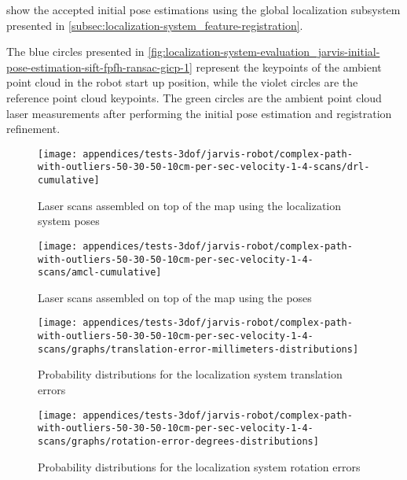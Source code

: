  show the accepted initial pose estimations using the global localization subsystem presented in \cref{subsec:localization-system_feature-registration}.

The blue circles presented in \cref{fig:localization-system-evaluation_jarvis-initial-pose-estimation-sift-fpfh-ransac-gicp-1} represent the keypoints of the ambient point cloud in the robot start up position, while the violet circles are the reference point cloud keypoints. The green circles are the ambient point cloud laser measurements after performing the initial pose estimation and registration refinement.



\begin{figure}[H]
	\centering
	\texttt{[image: appendices/tests-3dof/jarvis-robot/complex-path-with-outliers-50-30-50-10cm-per-sec-velocity-1-4-scans/drl-cumulative]}
	\caption{Laser scans assembled on top of the map using the localization system poses}
	\label{fig:localization-system-evaluation_complex-path-with-outliers-50-30-50-10cm-per-sec-velocity-1-4-scans-drl-cumulative}
\end{figure}

\begin{figure}[H]
	\centering
	\texttt{[image: appendices/tests-3dof/jarvis-robot/complex-path-with-outliers-50-30-50-10cm-per-sec-velocity-1-4-scans/amcl-cumulative]}
	\caption{Laser scans assembled on top of the map using the  poses}
	\label{fig:localization-system-evaluation_complex-path-with-outliers-50-30-50-10cm-per-sec-velocity-1-4-scans-amcl-cumulative}
\end{figure}


\begin{figure}
	\centering
	\begin{minipage}[h]{0.497\textwidth}
		\centering
		\texttt{[image: appendices/tests-3dof/jarvis-robot/complex-path-with-outliers-50-30-50-10cm-per-sec-velocity-1-4-scans/graphs/translation-error-millimeters-distributions]}
		\caption{Probability distributions for the localization system translation errors}
		\label{fig:localization-system-evaluation_complex-path-with-outliers-50-30-50-10cm-per-sec-velocity-1-4-translation-error}
	\end{minipage}\hfill
	\begin{minipage}[h]{0.497\textwidth}
		\centering
		\texttt{[image: appendices/tests-3dof/jarvis-robot/complex-path-with-outliers-50-30-50-10cm-per-sec-velocity-1-4-scans/graphs/rotation-error-degrees-distributions]}
		\caption{Probability distributions for the localization system rotation errors}
		\label{fig:localization-system-evaluation_complex-path-with-outliers-50-30-50-10cm-per-sec-velocity-1-4-rotation-error}
	\end{minipage}
\end{figure}


